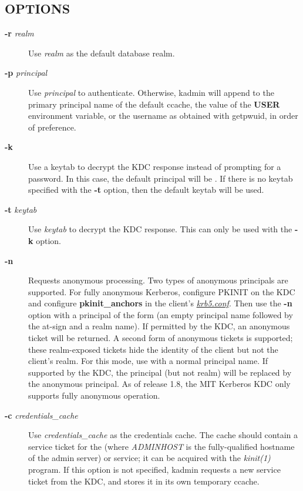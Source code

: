 \documentclass[letterpaper,10pt,english]{sphinxmanual}
\begin{document}
\subsection{OPTIONS}
\label{admin/admin_commands/kadmin_local:options}\label{admin/admin_commands/kadmin_local:kadmin-options}\begin{description}
\item[{\textbf{-r} \emph{realm}}] \leavevmode
Use \emph{realm} as the default database realm.

\item[{\textbf{-p} \emph{principal}}] \leavevmode
Use \emph{principal} to authenticate.  Otherwise, kadmin will append
 to the primary principal name of the default ccache,
the value of the \textbf{USER} environment variable, or the username as
obtained with getpwuid, in order of preference.

\item[{\textbf{-k}}] \leavevmode
Use a keytab to decrypt the KDC response instead of prompting for
a password.  In this case, the default principal will be
.  If there is no keytab specified with the
\textbf{-t} option, then the default keytab will be used.

\item[{\textbf{-t} \emph{keytab}}] \leavevmode
Use \emph{keytab} to decrypt the KDC response.  This can only be used
with the \textbf{-k} option.

\item[{\textbf{-n}}] \leavevmode
Requests anonymous processing.  Two types of anonymous principals
are supported.  For fully anonymous Kerberos, configure PKINIT on
the KDC and configure \textbf{pkinit\_anchors} in the client's
{\hyperref[admin/conf_files/krb5_conf:krb5-conf-5]{\emph{krb5.conf}}}.  Then use the \textbf{-n} option with a principal
of the form  (an empty principal name followed by the
at-sign and a realm name).  If permitted by the KDC, an anonymous
ticket will be returned.  A second form of anonymous tickets is
supported; these realm-exposed tickets hide the identity of the
client but not the client's realm.  For this mode, use  with a normal principal name.  If supported by the KDC, the
principal (but not realm) will be replaced by the anonymous
principal.  As of release 1.8, the MIT Kerberos KDC only supports
fully anonymous operation.

\item[{\textbf{-c} \emph{credentials\_cache}}] \leavevmode
Use \emph{credentials\_cache} as the credentials cache.  The
cache should contain a service ticket for the 
(where \emph{ADMINHOST} is the fully-qualified hostname of the admin
server) or  service; it can be acquired with the
\emph{kinit(1)} program.  If this option is not specified, kadmin
requests a new service ticket from the KDC, and stores it in its
own temporary ccache.


\end{description}
\end{document}

